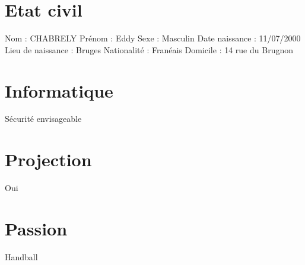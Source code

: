 \documentclass{article}
\begin{document}
\section{Etat civil}
Nom : CHABRELY
\newline
Prénom : Eddy
\newline
Sexe : Masculin
\newline
Date naissance : 11/07/2000
\newline
Lieu de naissance : Bruges 
\newline
Nationalité : Franéais
\newline
Domicile : 14 rue du Brugnon


\section{Informatique}
Sécurité envisageable

\section{Projection}
Oui

\section{Passion}
Handball
\end{document}
